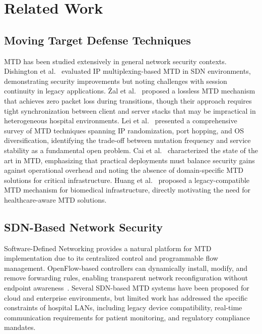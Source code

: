\documentclass[conference]{IEEEtran}
\begin{document}
\section{Related Work}

\subsection{Moving Target Defense Techniques}

MTD has been studied extensively in general network security contexts. Dishington et al.~\cite{dishington2019} evaluated IP multiplexing-based MTD in SDN environments, demonstrating security improvements but noting challenges with session continuity in legacy applications. \.{Z}al et al.~\cite{zal2024} proposed a lossless MTD mechanism that achieves zero packet loss during transitions, though their approach requires tight synchronization between client and server stacks that may be impractical in heterogeneous hospital environments. Lei et al.~\cite{lei2018} presented a comprehensive survey of MTD techniques spanning IP randomization, port hopping, and OS diversification, identifying the trade-off between mutation frequency and service stability as a fundamental open problem. Cai et al.~\cite{cai2016} characterized the state of the art in MTD, emphasizing that practical deployments must balance security gains against operational overhead and noting the absence of domain-specific MTD solutions for critical infrastructure. Huang et al.~\cite{huang2021} proposed a legacy-compatible MTD mechanism for biomedical infrastructure, directly motivating the need for healthcare-aware MTD solutions.

\subsection{SDN-Based Network Security}

Software-Defined Networking provides a natural platform for MTD implementation due to its centralized control and programmable flow management. OpenFlow-based controllers can dynamically install, modify, and remove forwarding rules, enabling transparent network reconfiguration without endpoint awareness~\cite{mckeown2008}. Several SDN-based MTD systems have been proposed for cloud and enterprise environments, but limited work has addressed the specific constraints of hospital LANs, including legacy device compatibility, real-time communication requirements for patient monitoring, and regulatory compliance mandates.
\end{document}
